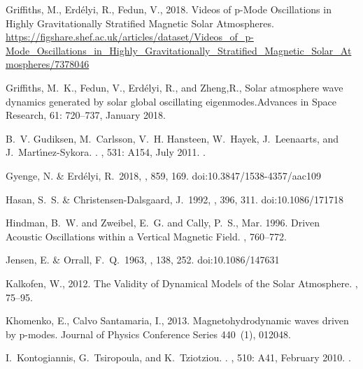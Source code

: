 \documentclass[linenumbers]{aastex63}
\begin{document}
\begin{thebibliography}{}
{Griffiths}, M., {Erd{\'e}lyi}, R., {Fedun}, V., 2018. {Videos of p-Mode Oscillations in Highly Gravitationally Stratified Magnetic Solar Atmospheres}.
\newline \url{https://figshare.shef.ac.uk/articles/dataset/Videos_of_p-Mode_Oscillations_in_Highly_Gravitationally_Stratified_Magnetic_Solar_Atmospheres/7378046}




{Griffiths}, M.~K., {Fedun}, V., {Erd{\'e}lyi}, R., and {Zheng},R.,
{Solar atmosphere wave dynamics generated by solar global oscillating
  eigenmodes}.{Advances in Space Research}, 61: 720--737, January 2018.

B.~V. {Gudiksen}, M.~{Carlsson}, V.~H. {Hansteen}, W.~{Hayek}, J.~{Leenaarts},
  and J.~{Mart{\'{\i}}nez-Sykora}.
.
\newblock \emph{\aap}, 531: A154, July 2011.
\newblock {}.


 Gyenge, N. \& Erd{\'e}lyi, R.\ 2018, \apj, 859, 169. doi:10.3847/1538-4357/aac109

 Hasan, S.~S. \& Christensen-Dalsgaard, J.\ 1992, \apj, 396, 311. doi:10.1086/171718



{Hindman}, B.~W. and {Zweibel}, E.~G. and {Cally}, P.~S., Mar. 1996. {Driven Acoustic Oscillations within a Vertical Magnetic Field}. , 760--772.

 Jensen, E. \& Orrall, F.~Q.\ 1963, \apj, 138, 252. doi:10.1086/147631


{Kalkofen}, W., 2012. {The Validity of Dynamical Models of the Solar
  Atmosphere}. , 75--95.

{Khomenko}, E., {Calvo Santamaria}, I., 2013. {Magnetohydrodynamic waves driven
  by p-modes}. Journal of Physics Conference Series 440~(1), 012048.


I.~{Kontogiannis}, G.~{Tsiropoula}, and K.~{Tziotziou}.
.
\newblock \emph{\aap}, 510: A41, February 2010.
\newblock {}.


\end{thebibliography}
\end{document}
